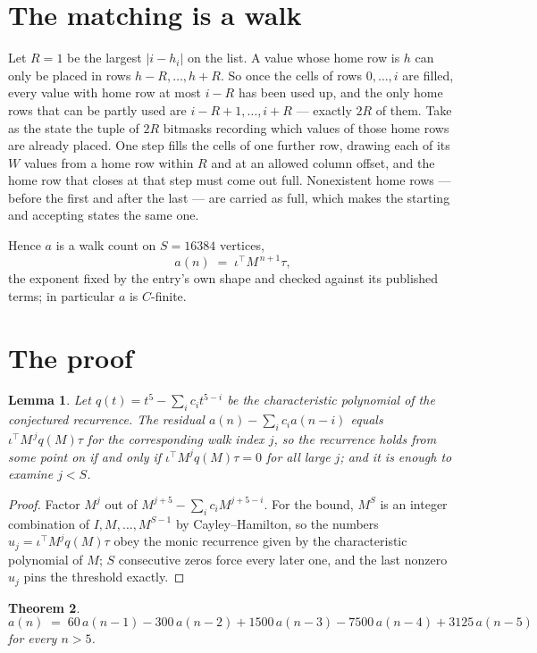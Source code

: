 \documentclass[11pt,a4paper]{article}
\theoremstyle{plain}
\newtheorem{theorem}{Theorem}
\newtheorem{lemma}[theorem]{Lemma}
\theoremstyle{definition}
\begin{document}
\section{The matching is a walk}

Let $R=1$ be the largest $|i-h_i|$ on the list. A value whose home row is $h$ can only be
placed in rows $h-R,\dots,h+R$. So once the cells of rows $0,\dots,i$ are filled, every
value with home row at most $i-R$ has been used up, and the only home rows that can be
partly used are $i-R+1,\dots,i+R$ --- exactly $2R$ of them. Take as the state the tuple of
$2R$ bitmasks recording which values of those home rows are already placed. One step fills
the cells of one further row, drawing each of its $W$ values from a home row within $R$
and at an allowed column offset, and the home row that closes at that step must come out
full. Nonexistent home rows --- before the first and after the last --- are carried as
full, which makes the starting and accepting states the same one.

Hence $a$ is a walk count on $S=16384$ vertices,
\[
a(n)\;=\;\iota^{\!\top}M^{\,n+1}\tau ,
\]
the exponent fixed by the entry's own shape and checked against its published terms; in
particular $a$ is $C$-finite.

\section{The proof}

\begin{lemma}\label{lem:crit}
Let $q(t)=t^{5}-\sum_i c_it^{5-i}$ be the characteristic polynomial of the
conjectured recurrence. The residual $a(n)-\sum_ic_ia(n-i)$ equals
$\iota^{\!\top}M^{\,j}q(M)\tau$ for the corresponding walk index $j$, so the recurrence
holds from some point on if and only if $\iota^{\!\top}M^{j}q(M)\tau=0$ for all large $j$;
and it is enough to examine $j<S$.
\end{lemma}

\begin{proof}
Factor $M^{j}$ out of $M^{j+5}-\sum_ic_iM^{j+5-i}$. For the bound, $M^{S}$
is an integer combination of $I,M,\dots,M^{S-1}$ by Cayley--Hamilton, so the numbers
$u_j=\iota^{\!\top}M^{j}q(M)\tau$ obey the monic recurrence given by the characteristic
polynomial of $M$; $S$ consecutive zeros force every later one, and the last nonzero $u_j$
pins the threshold exactly.
\end{proof}

\begin{theorem}
\[
a(n)\;=\;60\,a(n-1) - 300\,a(n-2) + 1500\,a(n-3) - 7500\,a(n-4) + 3125\,a(n-5)
\]
for every $n>5$.
\end{theorem}
\end{document}
